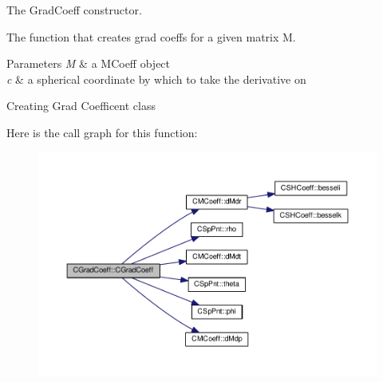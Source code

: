 The Grad\-Coeff constructor. 

The function that creates grad coeffs for a given matrix M. 
\begin{DoxyParams}{Parameters}
{\em M} & a M\-Coeff object \\
\hline
{\em c} & a spherical coordinate by which to take the derivative on\\
\hline
\end{DoxyParams}
Creating Grad Coefficent class 

Here is the call graph for this function\-:\nopagebreak
\begin{figure}[H]
\begin{center}
\leavevmode
\includegraphics[width=350pt]{classCGradCoeff_a41d80b3998f3dfe2a9111ab9f00855fb_cgraph}
\end{center}
\end{figure}




